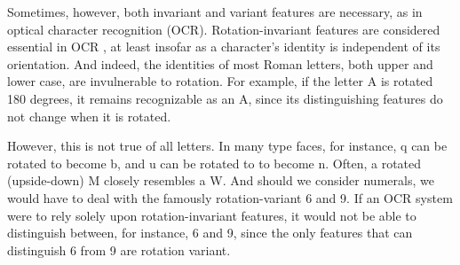 


Sometimes, however, both invariant and variant features are necessary, 
as in optical character recognition (OCR)\citep{trier-et-al:1996}.
Rotation-invariant features are considered essential in OCR \citep{trier-et-al:1996}, 
at least
insofar as a character's identity is independent 
of its orientation.
And indeed, the identities of most Roman letters, both upper and lower case, are invulnerable to rotation.
For example, if the letter \textsf{A} is rotated 180 degrees, it remains 
recognizable as an \textsf{A}, since its distinguishing features do not change when it is rotated. 
 
However, this is not true of all letters. In many type faces, for instance, 
\textsf{q} can be rotated to become \textsf{b}, and \textsf{u} can be rotated to 
to become \textsf{n}. Often, a rotated (upside-down) \textsf{M} closely 
resembles a \textsf{W}. And should we consider numerals, we would have to deal 
with the famously rotation-variant \textsf{6} and \textsf{9}. If an 
OCR system were to rely solely upon rotation-invariant features, it
would not be able to distinguish between, for instance, \textsf{6} and 
\textsf{9}, since the only features that can distinguish \textsf{6} from \textsf{9}
are rotation variant.

